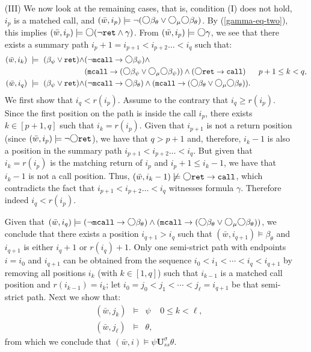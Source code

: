\documentclass{LMCS}
\newcommand{\M}{{\mu}}
\newcommand{\w}{{\bar{w}}}
\newcommand{\dm}{\Diamond}
\newcommand{\U}{{\mathbf U}}
\newcommand{\next}{\text{\raisebox{1pt}{$\bigcirc$}}}
\theoremstyle{plain}
\theoremstyle{definition}
\newcommand{\ppath}{\sigma} \newcommand{\Ul}{\U}
\newcommand{\Up}{\U^\ppath}
\newcommand{\Uss}{\Up_{ss}}
\newcommand{\mcall}{{\tt{mcall}}}
\newcommand{\rett}{{\tt ret}}
\newcommand{\call}{{\tt call}}
\newcommand{\dmm}{\dm_{\M}}
\renewcommand{\dm}{\next}
\renewcommand{\dmm}{\dm_\M}
\begin{document}
\begin{enumerate}[(a)]
\item[(III)] We now look at the remaining cases, that is,  condition
  (I) does not hold, $i_p$ is a matched call, and 
$(\w,i_p) \models \neg (\dm\beta_\theta \vee \dmm\dm\beta_\theta)$. By
  (\ref{gamma-eq-two}), this implies 
$(\w, i_p) \models \dm (\neg \rett \wedge \gamma)$.  
{From} $(\w, i_p)
\models \dm \gamma$, we see that there exists a summary path
$i_p+1 = i_{p+1} < i_{p+2} \ldots < i_q$ such that:
{\small
\begin{align*}
(\w, i_k) \ \models \ (\beta_\psi \vee \rett) \wedge & (\neg \mcall
\to \dm \beta_\psi) \wedge \\
& (\mcall \to (\dm \beta_\psi \vee \dmm \dm \beta_\psi)) \wedge (\dm \rett
\to \call) \ \ \ \ \ p+1 \leq k < q,\\    
(\w, i_q) \ \models \ (\beta_\psi \vee \rett) \wedge & (\neg\mcall \to
\dm \beta_\theta) \wedge (\mcall \to (\dm \beta_\theta \vee \dmm \dm
\beta_\theta)).
\end{align*}}\noindent
We first show that $i_q < r(i_p)$. Assume to the contrary that $i_q
\geq r(i_p)$. Since the first position on the path is inside the call
$i_p$, there exists $k \in [p+1,q]$ such that $i_k =
r(i_p)$. Given that $i_{p+1}$ is not a return position (since
$(\w,i_p) \models \neg \dm\rett$), we have that $q >
p+1$ and, therefore, $i_k-1$ is also a position in the summary path $i_{p+1} <
i_{p+2} \ldots < i_q$. But given that $i_k = r(i_p)$ is the matching
return of $i_p$ and $i_p+1 \leq i_k-1$, we have that $i_k-1$ is not a
call position. Thus, $(\w, i_k-1) \not\models \dm \rett \to \call$,
which contradicts the fact that $i_{p+1} < i_{p+2} \ldots < i_q$
witnesses formula $\gamma$. Therefore indeed $i_q < r(i_p)$.

Given that $(\w, i_q) \models (\neg\mcall \to \dm \beta_\theta) \wedge
(\mcall \to (\dm \beta_\theta \vee \dmm \dm \beta_\theta))$, we conclude
that there exists a position $i_{q+1} > i_q$ such that $(\w, i_{q+1})
\models
\beta_\theta$ and $i_{q+1}$ is either $i_q+1$ or $r(i_q)+1$. Only one
semi-strict path with endpoints $i = i_0$ and $i_{q+1}$ can be
obtained from the sequence $i_0 < i_1 < \cdots < i_q < i_{q+1}$ by
removing all positions $i_k$ (with $k \in [1, q]$) such that $i_{k-1}$
is a matched call position and $r(i_{k-1}) = i_k$; let $i_0 = j_0 < j_1 <
\cdots < j_\ell = i_{q+1}$ be that semi-strict path. Next we
show that:
\begin{eqnarray*}
(\w, j_k) & \models & \psi \ \ \ \ \ 0 \leq k < \ell,\\
(\w, j_\ell) & \models & \theta,
\end{eqnarray*}
from which we conclude that $(\w, i) \models \psi \Uss \theta$. 


\end{enumerate}
\end{document}
